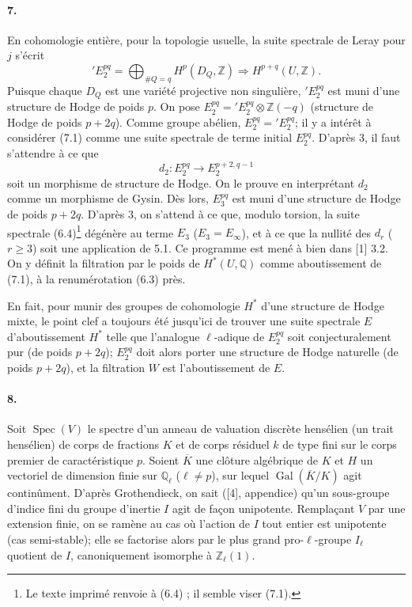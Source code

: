 \documentclass[10pt]{article}
\newcommand{\Q}{\mathbb Q}
\newcommand{\Z}{\mathbb Z}
\newcommand{\Ql}{\mathbb Q_\ell}
\newcommand{\Zl}{\mathbb Z_\ell}
\newcommand{\Gal}{\operatorname{Gal}}
\newcommand{\Spec}{\operatorname{Spec}}
\newcommand{\barK}{\overline{K}}
\begin{document}
\paragraph{7.} En cohomologie entière, pour la topologie usuelle, la suite spectrale de Leray pour $j$ s'écrit
\[
\tag{7.1}
{}'E_2^{pq}=\bigoplus_{\#Q=q}H^p(D_Q,\Z)\Rightarrow H^{p+q}(U,\Z).
\]
Puisque chaque $D_Q$ est une variété projective non singulière, ${}'E_2^{pq}$ est muni d'une structure de Hodge de poids $p$. On pose $E_2^{pq}={}'E_2^{pq}\otimes\Z(-q)$ (structure de Hodge de poids $p+2q$). Comme groupe abélien, $E_2^{pq}={}'E_2^{pq}$; il y a intérêt à considérer (7.1) comme une suite spectrale de terme initial $E_2^{pq}$. D'après 3, il faut s'attendre à ce que
\[
d_2:E_2^{pq}\to E_2^{p+2,q-1}
\]
soit un morphisme de structure de Hodge. On le prouve en interprétant $d_2$ comme un morphisme de Gysin. Dès lors, $E_3^{pq}$ est muni d'une structure de Hodge de poids $p+2q$. D'après 3, on s'attend à ce que, modulo torsion, la suite spectrale (6.4)\footnote{Le texte imprimé renvoie à (6.4) ; il semble viser (7.1).} dégénère au terme $E_3$ ($E_3=E_\infty$), et à ce que la nullité des $d_r$ ($r\ge3$) soit une application de 5.1. Ce programme est mené à bien dans [1] 3.2. On y définit la filtration par le poids de $H^*(U,\Q)$ comme aboutissement de (7.1), à la renumérotation (6.3) près.

En fait, pour munir des groupes de cohomologie $H^*$ d'une structure de Hodge mixte, le point clef a toujours été jusqu'ici de trouver une suite spectrale $E$ d'aboutissement $H^*$ telle que l'analogue $\ell$-adique de $E_2^{pq}$ soit conjecturalement pur (de poids $p+2q$); $E_2^{pq}$ doit alors porter une structure de Hodge naturelle (de poids $p+2q$), et la filtration $W$ est l'aboutissement de $E$.

\paragraph{8.} Soit $\Spec(V)$ le spectre d'un anneau de valuation discrète hensélien (un trait hensélien) de corps de fractions $K$ et de corps résiduel $k$ de type fini sur le corps premier de caractéristique $p$. Soient $\barK$ une clôture algébrique de $K$ et $H$ un vectoriel de dimension finie sur $\Ql$ ($\ell\ne p$), sur lequel $\Gal(\barK/K)$ agit continûment. D'après Grothendieck, on sait ([4], appendice) qu'un sous-groupe d'indice fini du groupe d'inertie $I$ agit de façon unipotente. Remplaçant $V$ par une extension finie, on se ramène au cas où l'action de $I$ tout entier est unipotente (cas semi-stable); elle se factorise alors par le plus grand pro-$\ell$-groupe $I_\ell$ quotient de $I$, canoniquement isomorphe à $\Zl(1)$.
\end{document}
